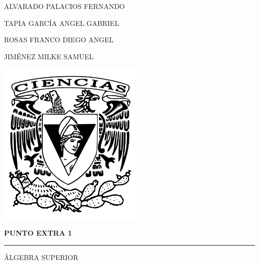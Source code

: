 
\thispagestyle{empty}
\begin{center}
	\large{\uppercase{Alvarado Palacios Fernando}} 

	\large{\uppercase{Tapia García Angel Gabriel}}
	
    \large{\uppercase{Rosas Franco Diego Angel}}   
    
    \large{\uppercase{Jiménez Milke Samuel}}

    \vspace{2 cm}
    \includegraphics[height=8cm]{img/logo-ciencias.png}
    \vspace{4 cm}
    
    {\Huge \textbf{PUNTO EXTRA 1}}
    \vspace{1 cm}
    \hrule
    \vspace{0.4 cm}
    {\huge {\uppercase{Álgebra Superior}}}
\end{center}